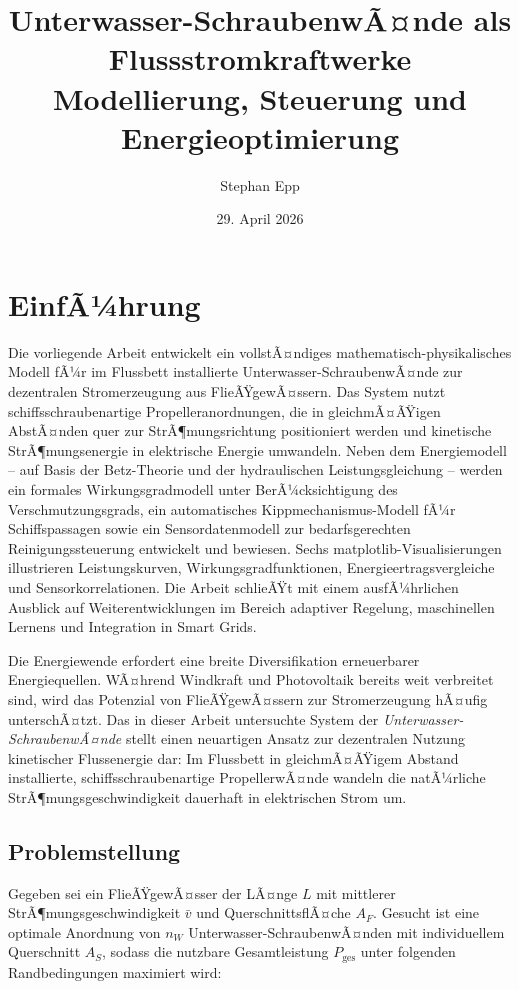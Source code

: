 ﻿\documentclass[a4paper,12pt]{article}
\title{{\bfseries Unterwasser-SchraubenwÃ¤nde als Flussstromkraftwerke}\\
Modellierung, Steuerung und Energieoptimierung}
\author{Stephan Epp}
\date{29. April 2026}
\theoremstyle{definition}
\begin{document}
\maketitle
\tableofcontents
\newpage

\section{EinfÃ¼hrung}
Die vorliegende Arbeit entwickelt ein vollstÃ¤ndiges mathematisch-physikalisches Modell fÃ¼r
im Flussbett installierte Unterwasser-SchraubenwÃ¤nde zur dezentralen Stromerzeugung aus
FlieÃŸgewÃ¤ssern. Das System nutzt schiffsschraubenartige Propelleranordnungen, die in
gleichmÃ¤ÃŸigen AbstÃ¤nden quer zur StrÃ¶mungsrichtung positioniert werden und kinetische
StrÃ¶mungsenergie in elektrische Energie umwandeln. Neben dem Energiemodell -- auf Basis
der Betz-Theorie und der hydraulischen Leistungsgleichung -- werden ein formales
Wirkungsgradmodell unter BerÃ¼cksichtigung des Verschmutzungsgrads, ein automatisches
Kippmechanismus-Modell fÃ¼r Schiffspassagen sowie ein Sensordatenmodell zur
bedarfsgerechten Reinigungssteuerung entwickelt und bewiesen. Sechs matplotlib-Visualisierungen
illustrieren Leistungskurven, Wirkungsgradfunktionen, Energieertragsvergleiche
und Sensorkorrelationen. Die Arbeit schlieÃŸt mit einem ausfÃ¼hrlichen Ausblick auf
Weiterentwicklungen im Bereich adaptiver Regelung, maschinellen Lernens und Integration
in Smart Grids.

Die Energiewende erfordert eine breite Diversifikation erneuerbarer Energiequellen.
WÃ¤hrend Windkraft und Photovoltaik bereits weit verbreitet sind, wird das Potenzial
von FlieÃŸgewÃ¤ssern zur Stromerzeugung hÃ¤ufig unterschÃ¤tzt. Das in dieser Arbeit
untersuchte System der \emph{Unterwasser-SchraubenwÃ¤nde} stellt einen neuartigen
Ansatz zur dezentralen Nutzung kinetischer Flussenergie dar: Im Flussbett in
gleichmÃ¤ÃŸigem Abstand installierte, schiffsschraubenartige PropellerwÃ¤nde wandeln
die natÃ¼rliche StrÃ¶mungsgeschwindigkeit dauerhaft in elektrischen Strom um.

\subsection{Problemstellung}

Gegeben sei ein FlieÃŸgewÃ¤sser der LÃ¤nge $L$ mit mittlerer StrÃ¶mungsgeschwindigkeit
$\bar{v}$ und QuerschnittsflÃ¤che $A_F$. Gesucht ist eine optimale Anordnung von $n_W$
Unterwasser-SchraubenwÃ¤nden mit individuellem Querschnitt $A_S$, sodass die nutzbare
Gesamtleistung $P_{\mathrm{ges}}$ unter folgenden Randbedingungen maximiert wird:
\end{document}
